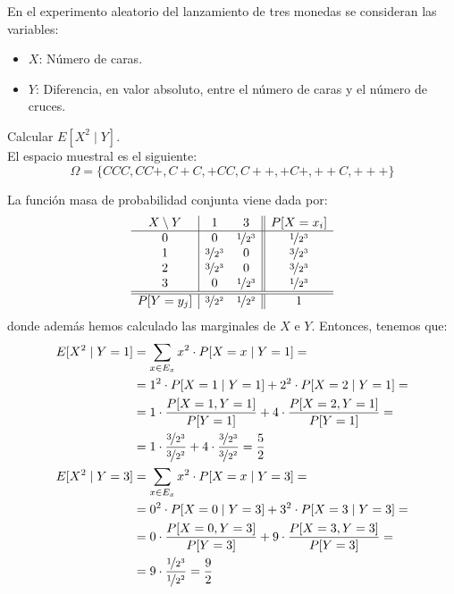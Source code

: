 \begin{ejemplo}
    En el experimento aleatorio del lanzamiento de tres monedas se consideran las variables:
    \begin{itemize}
        \item $X$: Número de caras.
        \item $Y$: Diferencia, en valor absoluto, entre el número de caras y el número de cruces.
    \end{itemize}
    Calcular $E[X^2\mid Y]$.\\

    El espacio muestral es el siguiente:
    \begin{equation*}
        \Omega = \{CCC, CC+, C+C, +CC, C++, +C+, ++C, +++\}
    \end{equation*}

    La función masa de probabilidad conjunta viene dada por:
    \begin{equation*}
        \begin{array}{c|cc||c}
            X\setminus Y & 1 & 3 & P[X=x_i] \\ \hline
            0 & 0 & \nicefrac{1}{2^3} & \nicefrac{1}{2^3} \\
            1 & \nicefrac{3}{2^3} & 0 & \nicefrac{3}{2^3} \\
            2 & \nicefrac{3}{2^3} & 0 & \nicefrac{3}{2^3} \\
            3 & 0 & \nicefrac{1}{2^3} & \nicefrac{1}{2^3} \\ \hline \hline
            P[Y=y_j] & \nicefrac{3}{2^2} & \nicefrac{1}{2^2} & 1
        \end{array}
    \end{equation*}
    donde además hemos calculado las marginales de $X$ e $Y$. Entonces, tenemos que:
    \begin{align*}
        E[X^2\mid Y=1]&=\sum_{x\in E_x} x^2\cdot P[X=x\mid Y=1] =\\&= 1^2\cdot P[X=1\mid Y=1] + 2^2\cdot P[X=2\mid Y=1] =\\&= 1\cdot \dfrac{P[X=1,Y=1]}{P[Y=1]} + 4\cdot \dfrac{P[X=2,Y=1]}{P[Y=1]} =\\&= 1\cdot \dfrac{\nicefrac{3}{2^3}}{\nicefrac{3}{2^2}} + 4\cdot \dfrac{\nicefrac{3}{2^3}}{\nicefrac{3}{2^2}} = \dfrac{5}{2}\\
        E[X^2\mid Y=3]&=\sum_{x\in E_x} x^2\cdot P[X=x\mid Y=3] =\\&= 0^2\cdot P[X=0\mid Y=3] + 3^2\cdot P[X=3\mid Y=3] =\\&= 0\cdot \dfrac{P[X=0,Y=3]}{P[Y=3]} + 9\cdot \dfrac{P[X=3,Y=3]}{P[Y=3]} =\\&= 9\cdot \dfrac{\nicefrac{1}{2^3}}{\nicefrac{1}{2^2}} = \dfrac{9}{2}
    \end{align*}


\end{ejemplo}
